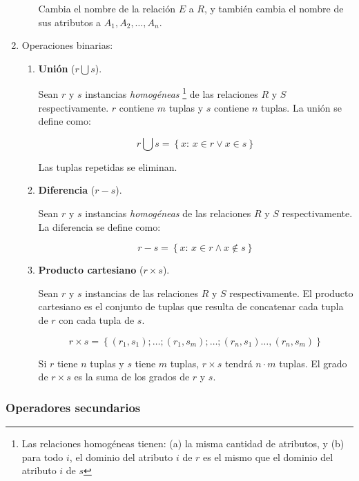 \documentclass[a4paper, twoside]{article}
\begin{document}
\begin{enumerate}
\begin{enumerate}
Cambia el nombre de la relación $E$ a $R$, y también cambia el nombre
de sus atributos a $A_{1},A_{2},\dots,A_{n}$.

\end{enumerate}
\item Operaciones binarias:

\begin{enumerate}
\item \textbf{Unión} ($r\bigcup s$).


Sean $r$ y $s$ instancias \emph{homogéneas}%
\footnote{Las relaciones homogéneas tienen: (a) la misma cantidad de atributos,
y (b) para todo $i$, el dominio del atributo $i$ de $r$ es el mismo
que el dominio del atributo $i$ de $s$%
}\emph{ }de las relaciones $R$ y $S$ respectivamente. $r$ contiene
$m$ tuplas y $s$ contiene $n$ tuplas. La unión se define como:


\[
r\bigcup s=\left\{ x:\, x\in r\vee x\in s\right\} 
\]



Las tuplas repetidas se eliminan.

\item \textbf{Diferencia} ($r-s$).


Sean $r$ y $s$ instancias \emph{homogéneas }de las relaciones $R$
y $S$ respectivamente. La diferencia se define como:


\[
r-s=\left\{ x:\, x\in r\wedge x\not\in s\right\} 
\]


\item \textbf{Producto cartesiano} ($r\times s$). 


Sean $r$ y $s$ instancias de las relaciones $R$ y $S$ respectivamente.
El producto cartesiano es el conjunto de tuplas que resulta de concatenar
cada tupla de $r$ con cada tupla de $s$.


\[
r\times s=\left\{ \left(r_{1},s_{1}\right);\ldots;\left(r_{1},s_{m}\right);\ldots;\left(r_{n},s_{1}\right)\ldots,\left(r_{n},s_{m}\right)\right\} 
\]



Si $r$ tiene $n$ tuplas y $s$ tiene $m$ tuplas, $r\times s$ tendrá
$n\cdot m$ tuplas. El grado de $r\times s$ es la suma de los grados
de $r$ y $s$.

\end{enumerate}
\end{enumerate}

\subsubsection{Operadores secundarios}
\end{document}

